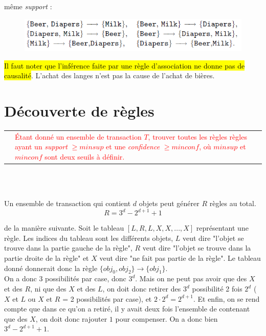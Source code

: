 \documentclass[letterpaper, 12pt]{article}
\newcommand{\alinea}{
\hspace*{0.5cm}}
\newcommand{\red}[1]{
	\textcolor{red}{#1}}
\newcommand{\myul}[1]{
		\underline{\smash{#1}}
	}
\begin{document}
			même \textit{support} :
			\begin{figure}[H]
				\centering
				\includegraphics[scale=0.725]{Images/support}
			\end{figure}\noindent
			\hl{Il faut noter que l'inférence faite par une règle 
			d'association ne donne pas de causalité}.
			L'achat des langes n'est pas la cause de l'achat de bières.
	\section{Découverte de règles}
		\begin{tabular}{lp{10.25cm}}
			\myul{\textbf{Découverte de règles d'association}} & 
			\red{\'Etant donné un ensemble de transaction $T$, trouver toutes
			les règles règles ayant un \textit{support} $ \geq minsup$ et
			une \textit{confidence} $ \geq minconf $, où $minsup$ et 
			$minconf$ sont deux seuils à définir.}
		\end{tabular}\noindent~\\\noindent~\\\noindent%
		\alinea Un ensemble de transaction
			qui contient $d$ objets peut générer $R$ règles au total.
		$$ R = 3^d - 2^{d+1} + 1 $$
		\alinea \myul{\hl{On peut le prouver}} de la manière suivante. 
			Soit le tableau $\left[L, R, L, X, X, ..., X\right]$ 
			représentant une règle. Les indices du tableau sont les 
			différents objets, $L$ veut dire "l'objet se trouve dans
			la partie gauche de la règle", $R$ veut dire "l'objet se trouve
			dans la partie droite de la règle"
			et $X$ veut dire "ne fait pas partie de la règle". Le tableau
			donné donnerait donc la règle $\{obj_0, obj_2\} \longrightarrow
			\{obj_1\}$.\\
		\alinea On a donc 3 possibilités par case, donc $3^d$. Mais on ne
			peut pas avoir que des $X$ et des $R$, 
			ni que des $X$ et des $L$, on doit donc retirer des $3^d$ 
			possibilité 2 fois $2^d$ ($X$ et $L$ ou $X$ et $R$ = 2 
			possibilités par case), et $2\cdot 2^d = 2^{d+1}$. Et enfin,
			on se rend compte que dans ce qu'on a retiré, il y avait
			deux fois l'ensemble de contenant que des $X$, on doit 
			donc rajouter $1$ pour compenser. On a donc bien 
			$3^d - 2^{d+1} + 1$.\\
		\newpage\noindent
\end{document}
